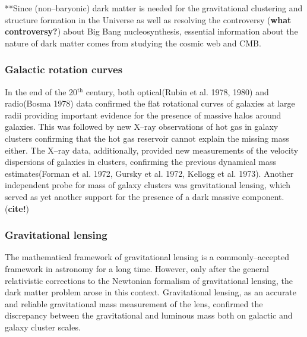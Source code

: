 \documentclass[paper=a4, fontsize=11pt]{scrartcl} %
\numberwithin{equation}{section} %
\numberwithin{figure}{section} %
\numberwithin{table}{section} %
\begin{document}
**Since (non--baryonic) dark matter is needed for the gravitational clustering and structure formation in the Universe as well as resolving the controversy ({\bf what controversy?}) about Big Bang nucleosynthesis, essential information about the nature of dark matter comes from studying the cosmic web and CMB.

\subsubsection{Galactic rotation curves}
In the end of the 20$^\mathrm{th}$ century, both optical(Rubin et al. 1978, 1980) and radio(Bosma 1978) data confirmed the flat rotational curves of galaxies at large radii providing important evidence for the presence of massive halos around galaxies. This was followed by new X--ray observations of hot gas in galaxy clusters confirming that the hot gas reservoir cannot explain the missing mass either. The X--ray data, additionally, provided new measurements of the velocity dispersions of galaxies in clusters, confirming the previous dynamical mass estimates(Forman et al. 1972, Gursky et al. 1972, Kellogg et al. 1973). Another independent probe for mass of galaxy clusters was gravitational lensing, which served as yet another support for the presence of a dark massive component.({\bf cite!})

\subsubsection{Gravitational lensing}
The mathematical framework of gravitational lensing is a commonly--accepted framework in astronomy for a long time. However, only after the general relativistic corrections to the Newtonian formalism of gravitational lensing, the dark matter problem arose in this context. Gravitational lensing, as an accurate and reliable gravitational mass measurement of the lens, confirmed the discrepancy between the gravitational and luminous mass both on galactic and galaxy cluster scales.
\end{document}
